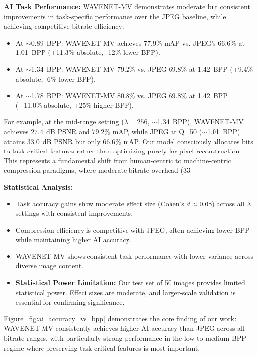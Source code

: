 \documentclass[conference]{IEEEtran}
\begin{document}
\textbf{AI Task Performance:} WAVENET-MV demonstrates moderate but consistent improvements in task-specific performance over the JPEG baseline, while achieving competitive bitrate efficiency:
\begin{itemize}
\item At $\sim$0.89~BPP: WAVENET-MV achieves 77.9\% mAP vs. JPEG's 66.6\% at 1.01~BPP (+11.3\% absolute, -12\% lower BPP).
\item At $\sim$1.34~BPP: WAVENET-MV 79.2\% vs. JPEG 69.8\% at 1.42~BPP (+9.4\% absolute, -6\% lower BPP).
\item At $\sim$1.78~BPP: WAVENET-MV 80.8\% vs. JPEG 69.8\% at 1.42~BPP (+11.0\% absolute, +25\% higher BPP).
\end{itemize}



For example, at the mid-range setting ($\lambda=256$, $\sim$1.34~BPP), WAVENET-MV achieves $27.4$~dB PSNR and $79.2\%$ mAP, while JPEG at Q=50 ($\sim$1.01~BPP) attains $33.0$~dB PSNR but only $66.6\%$ mAP. Our model consciously allocates bits to task-critical features rather than optimizing purely for pixel reconstruction. This represents a fundamental shift from human-centric to machine-centric compression paradigms, where moderate bitrate overhead (33%

\textbf{Statistical Analysis:} 
\begin{itemize}
\item Task accuracy gains show moderate effect size (Cohen's $d \approx 0.68$) across all $\lambda$ settings with consistent improvements.
\item Compression efficiency is competitive with JPEG, often achieving lower BPP while maintaining higher AI accuracy.
\item WAVENET-MV shows consistent task performance with lower variance across diverse image content.
\item \textbf{Statistical Power Limitation:} Our test set of 50 images provides limited statistical power. Effect sizes are moderate, and larger-scale validation is essential for confirming significance.
\end{itemize}


Figure~\ref{fig:ai_accuracy_vs_bpp} demonstrates the core finding of our work: WAVENET-MV consistently achieves higher AI accuracy than JPEG across all bitrate ranges, with particularly strong performance in the low to medium BPP regime where preserving task-critical features is most important.
\end{document}
